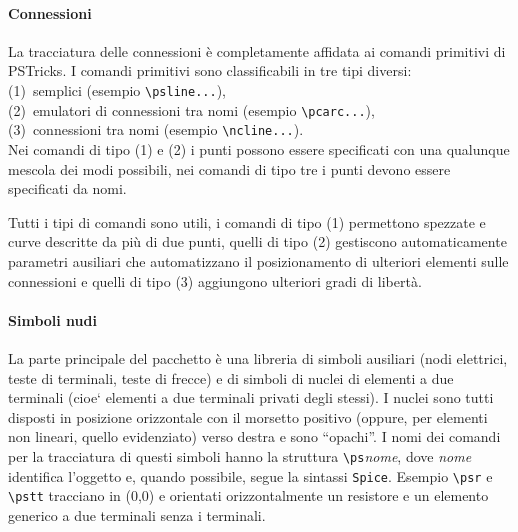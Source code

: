 \documentclass[12pt,a4paper]{articolo}
\begin{document}
\paragraph{Connessioni}
La tracciatura delle connessioni \`e completamente affidata ai comandi primitivi di PSTricks.
I comandi primitivi sono classificabili in tre tipi diversi:\\
(1)~semplici (esempio \verb"\psline..."),\\
(2)~emulatori di connessioni tra nomi (esempio \verb"\pcarc..."),\\
(3)~connessioni tra nomi (esempio \verb"\ncline...").\\
Nei comandi di tipo (1) e (2) i punti possono essere specificati con una qualunque mescola dei modi possibili, nei comandi di tipo tre i punti devono essere specificati da nomi.

Tutti i tipi di comandi sono utili, i comandi di tipo (1) permettono spezzate e curve descritte da pi\`u di due punti, quelli di tipo (2) gestiscono automaticamente parametri ausiliari che automatizzano il posizionamento di ulteriori elementi sulle connessioni e quelli di tipo (3) aggiungono ulteriori gradi di libert\`a.

\paragraph{Simboli nudi}
La parte principale del pacchetto \`e una libreria di simboli ausiliari (nodi elettrici, teste di terminali, teste di frecce) e di simboli di nuclei di elementi a due terminali (cioe` elementi a due terminali privati degli stessi).
I nuclei sono tutti disposti in posizione orizzontale con il morsetto positivo (oppure, per elementi non lineari, quello evidenziato) verso destra e sono ``opachi''.
I nomi dei comandi per la tracciatura di questi simboli hanno la struttura \verb"\ps"\textit{nome}, dove \textit{nome} identifica l'oggetto e, quando possibile, segue la sintassi \texttt{Spice}.
Esempio \verb"\psr" e \verb"\pstt" tracciano in (0,0) e orientati orizzontalmente un resistore e un elemento generico a due terminali senza i terminali.
\end{document}
